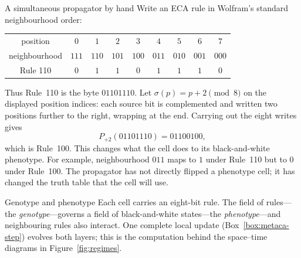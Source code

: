 \documentclass[man,12pt,floatsintext,donotrepeattitle]{apa7}
\newcommand{\sig}{\sigma}
\begin{document}
\begin{workedexample}[label={box:propagator}]{A simultaneous propagator by hand}
\small
Write an ECA rule in Wolfram's standard neighbourhood order:
\begin{center}
\setlength{\tabcolsep}{3.2pt}
\begin{tabular}{c@{\quad}*{8}{c}}
position & $0$ & $1$ & $2$ & $3$ & $4$ & $5$ & $6$ & $7$ \\
neighbourhood & $111$ & $110$ & $101$ & $100$ & $011$ & $010$ & $001$ & $000$ \\
\midrule
Rule 110 & $0$ & $1$ & $1$ & $0$ & $1$ & $1$ & $1$ & $0$ \\
\end{tabular}
\end{center}
Thus Rule~110 is the byte $01101110$. Let $\sig(p)=p+2\pmod 8$ on the
displayed position indices: each source bit is complemented and written two
positions further to the right, wrapping at the end.
Carrying out the eight writes gives
\[
P_{+2}(01101110)=01100100,
\]
which is Rule~100. This changes what the cell does to its black-and-white
phenotype. For example, neighbourhood $011$ maps to $1$ under Rule~110 but
to $0$ under Rule~100. The propagator has not directly flipped a phenotype
cell; it has changed the truth table that the cell will use.
\end{workedexample}

\begin{definition}[label={def:genopheno}]{Genotype and phenotype}
Each cell carries an eight-bit rule. The field of rules---the
\emph{genotype}---governs a field of black-and-white states---the
\emph{phenotype}---and neighbouring rules also interact. One complete local
update (Box~\ref{box:metaca-step}) evolves both layers; this is the computation
behind the space--time diagrams in Figure~\ref{fig:regimes}.
\end{definition}
\end{document}
